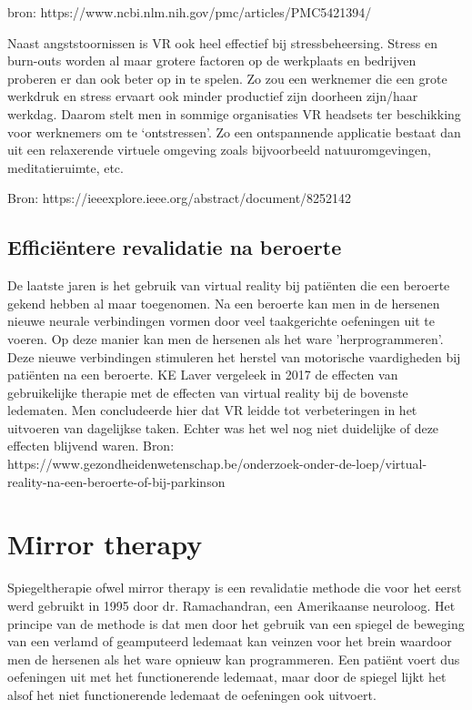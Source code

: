 bron: https://www.ncbi.nlm.nih.gov/pmc/articles/PMC5421394/

Naast angststoornissen is VR ook heel effectief bij stressbeheersing. Stress en burn-outs worden al maar grotere factoren op de werkplaats en bedrijven proberen er dan ook beter op in te spelen. Zo zou een werknemer die een grote werkdruk en stress ervaart ook minder productief zijn doorheen zijn/haar werkdag. Daarom stelt men in sommige organisaties VR headsets ter beschikking voor werknemers om te ‘ontstressen’.  
Zo een ontspannende applicatie bestaat dan uit een relaxerende virtuele omgeving zoals bijvoorbeeld natuuromgevingen, meditatieruimte, etc.

Bron: https://ieeexplore.ieee.org/abstract/document/8252142



\subsection{Efficiëntere revalidatie na beroerte}  
De laatste jaren is het gebruik van virtual reality bij patiënten die een beroerte gekend hebben al maar toegenomen. Na een beroerte kan men in de hersenen nieuwe neurale verbindingen vormen door veel taakgerichte oefeningen uit te voeren. Op deze manier kan men de hersenen als het ware 'herprogrammeren'. Deze nieuwe verbindingen stimuleren het herstel van motorische vaardigheden bij patiënten na een beroerte. KE Laver vergeleek in 2017 de effecten van gebruikelijke therapie met de effecten van virtual reality bij de bovenste ledematen. Men concludeerde hier dat VR leidde tot verbeteringen in het uitvoeren van dagelijkse taken. Echter was het wel nog niet duidelijke of deze effecten blijvend waren.
Bron: https://www.gezondheidenwetenschap.be/onderzoek-onder-de-loep/virtual-reality-na-een-beroerte-of-bij-parkinson

\section{Mirror therapy}
Spiegeltherapie ofwel mirror therapy is een revalidatie methode die voor het eerst werd gebruikt in 1995 door dr. Ramachandran, een Amerikaanse neuroloog. Het principe van de methode is dat men door het gebruik van een spiegel de beweging van een verlamd of geamputeerd ledemaat kan veinzen voor het brein waardoor men de hersenen als het ware opnieuw kan programmeren.
Een patiënt voert dus oefeningen uit met het functionerende ledemaat, maar door de spiegel lijkt het alsof het niet functionerende ledemaat de oefeningen ook uitvoert.

